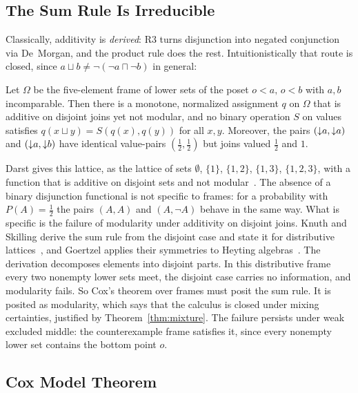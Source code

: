 \subsection{The Sum Rule Is Irreducible}

Classically, additivity is \emph{derived}: R3 turns disjunction into
negated conjunction via De~Morgan, and the product rule does the
rest.  Intuitionistically that route is closed, since
$a \sqcup b \neq \neg(\neg a \sqcap \neg b)$ in general:

\begin{example}
\label{thm:no-functional}
Let $\Omega$ be the five-element frame of lower sets of the poset
$o < a,\, o < b$ with $a, b$ incomparable.  Then there is a
monotone, normalized assignment $q$ on $\Omega$ that is additive on
disjoint joins yet not modular, and no binary operation $S$ on
values satisfies $q(x \sqcup y) = S(q(x), q(y))$ for all $x, y$.
Moreover, the
pairs $({\downarrow} a, {\downarrow} a)$ and $({\downarrow} a,
{\downarrow} b)$ have identical value-pairs $(\tfrac12, \tfrac12)$
but joins valued $\tfrac12$ and $1$.
\end{example}

\noindent
Darst gives this lattice, as the lattice of sets $\emptyset$, $\{1\}$,
$\{1,2\}$, $\{1,3\}$, $\{1,2,3\}$, with a function that is additive on
disjoint sets and not modular~\cite{darst1970}. The absence of a binary
disjunction functional is not specific to
frames: for a probability with $P(A) = \tfrac12$ the pairs $(A, A)$ and
$(A, \neg A)$ behave in the same way. What is specific is the failure of
modularity under additivity on disjoint joins. Knuth and Skilling derive
the sum rule from the disjoint case and state it for distributive
lattices~\cite{knuth-skilling2012}, and Goertzel applies their symmetries
to Heyting algebras~\cite{goertzel2017}. The derivation decomposes elements
into disjoint parts. In this distributive frame every two nonempty lower
sets meet, the disjoint case carries no information, and modularity
fails. So Cox's theorem over frames must posit the sum rule. It is
posited as modularity, which says that the calculus is closed under
mixing certainties, justified by Theorem~\ref{thm:mixture}. The failure
persists under weak excluded middle: the counterexample frame satisfies
it, since every nonempty lower set contains
the bottom point $o$.

\subsection{Cox Model Theorem}
\label{sec:cox-theorem}

